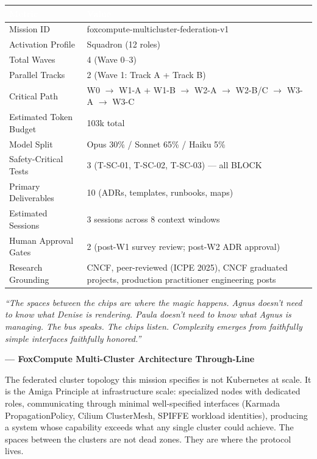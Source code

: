 \documentclass[11pt,letterpaper]{article}
\newcommand{\tableheader}[1]{\textbf{\sffamily\textcolor{white}{#1}}}
\begin{document}
\begin{center}
\begin{tabularx}{\textwidth}{L{5cm}X}
\toprule
{}
\tableheader{Metric} & \tableheader{Value} \\
\midrule
Mission ID & foxcompute-multicluster-federation-v1 \\
Activation Profile & Squadron (12 roles) \\
Total Waves & 4 (Wave 0--3) \\
Parallel Tracks & 2 (Wave 1: Track A + Track B) \\
Critical Path & W0 $\to$ W1-A + W1-B $\to$ W2-A $\to$ W2-B/C $\to$ W3-A $\to$ W3-C \\
Estimated Token Budget & 103k total \\
Model Split & Opus 30\% / Sonnet 65\% / Haiku 5\% \\
Safety-Critical Tests & 3 (T-SC-01, T-SC-02, T-SC-03) --- all BLOCK \\
Primary Deliverables & 10 (ADRs, templates, runbooks, maps) \\
Estimated Sessions & 3 sessions across 8 context windows \\
Human Approval Gates & 2 (post-W1 survey review; post-W2 ADR approval) \\
Research Grounding & CNCF, peer-reviewed (ICPE 2025), CNCF graduated projects, production practitioner engineering posts \\
\bottomrule
\end{tabularx}
\end{center}

\vspace{2em}

\begin{quotebox}
\textit{``The spaces between the chips are where the magic happens. Agnus doesn't need to know what Denise is rendering. Paula doesn't need to know what Agnus is managing. The bus speaks. The chips listen. Complexity emerges from faithfully simple interfaces faithfully honored.''}

\vspace{0.8em}
\textbf{--- FoxCompute Multi-Cluster Architecture Through-Line}

\vspace{0.6em}
\normalfont\small
The federated cluster topology this mission specifies is not Kubernetes at scale. It is the Amiga Principle at infrastructure scale: specialized nodes with dedicated roles, communicating through minimal well-specified interfaces (Karmada PropagationPolicy, Cilium ClusterMesh, SPIFFE workload identities), producing a system whose capability exceeds what any single cluster could achieve. The spaces between the clusters are not dead zones. They are where the protocol lives.
\end{quotebox}
\end{document}
